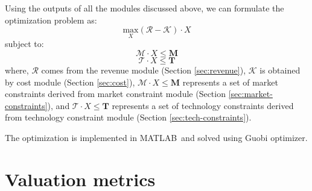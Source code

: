 Using the outputs of all the modules discussed above,  we can formulate the optimization problem as:
\begin{equation*}
\underset{X}{\text{max}} \left( \mathcal{R} - \mathcal{K} \right) \cdot X
\end{equation*}
subject to:
\begin{equation*}
\mathcal{M} \cdot X \leq \mathbf{M}
\end{equation*}
\begin{equation*}
\mathcal{T} \cdot X \leq \mathbf{T}
\end{equation*}
where, $\mathcal{R}$ comes from the revenue module (Section \ref{sec:revenue}), $\mathcal{K}$ is obtained by cost module (Section \ref{sec:cost}), $\mathcal{M} \cdot X \leq \mathbf{M}$ represents a set of market constraints derived from market constraint module (Section \ref{sec:market-constraints}), and $\mathcal{T} \cdot X \leq \mathbf{T}$ represents a set of technology constraints derived from technology constraint module (Section \ref{sec:tech-constraints}). 

The optimization is implemented in MATLAB\textcopyright~and solved using Guobi optimizer. 

\section{Valuation metrics}

